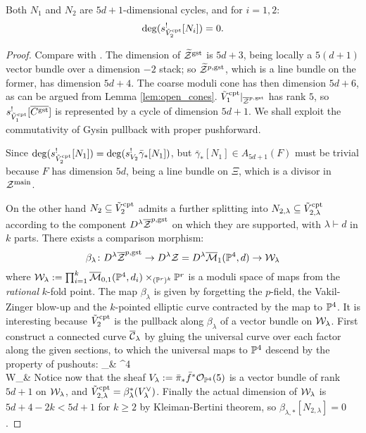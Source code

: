 \begin{lem}\label{lem:boundary}
 Both $N_1$ and $N_2$ are $5d+1$-dimensional cycles, and for $i=1,2$: \[\deg(s_{\tilde{V}_2^{\rm{cpt}}}^![N_i])=0.\]
\end{lem}
\begin{proof}
 Compare with \cite[Lemma 8.1]{CL-pfields}. The dimension of $\widetilde{\mathcal Z}^{\rm{gst}}$ is $5d+3$, being locally a $5(d+1)$ vector bundle over a dimension $-2$ stack; so $\widetilde{\mathcal Z}^{p,\rm{gst}}$, which is a line bundle on the former, has dimension $5d+4$. The coarse moduli cone has then dimension $5d+6$, as can be argued from Lemma \ref{lem:open_cones}. $\tilde{V}_1^{\rm{cpt}}\rvert_{\overline{\mathcal Z}^{p,\rm{gst}}}$ has rank $5$, so $s_{\tilde{V}_1^{\rm{cpt}}}^![\overline {C^{\rm{gst}}}]$ is represented by a cycle of dimension $5d+1$. We shall exploit the commutativity of Gysin pullback with proper pushforward.

Since $\deg(s_{\tilde{V}_2^{\rm{cpt}}}^![N_1])=\deg(s_{V_2}^!\bar{\gamma}_*[N_1])$, but $\bar{\gamma}_*[N_1]\in A_{5d+1}(F)$ must be trivial because $F$ has dimension $5d$, being a line bundle on $\Xi$, which is a divisor in $\mathcal Z^{\rm{main}}$.

On the other hand $N_2\subseteq \tilde{V}_2^{\rm{cpt}}$ admits a further splitting into $N_{2,\lambda}\subseteq \tilde{V}_{2,\lambda}^{\rm{cpt}}$ according to the component $D^{\lambda}\overline{\mathcal Z}^{p,\rm{gst}}$ on which they are supported, with $\lambda\vdash d$ in $k$ parts. There exists a comparison morphism:
\[\beta_{\lambda}\colon D^\lambda\overline{\mathcal Z}^{p,\rm{gst}}\rightarrow D^\lambda\mathcal Z=D^\lambda\overline{\mathcal{M}}_1(\mathbb P^4,d)\rightarrow \mathcal W_{\lambda}\]
where $\mathcal W_{\lambda}:=\prod_{i=1}^k \overline{\mathcal{M}}_{0,1}(\mathbb P^4,d_i)\times_{(\mathbb P^r)^k}\mathbb P^r$ is a moduli space of maps from the \emph{rational} $k$-fold point. The map $\beta_{\lambda}$ is given by forgetting the $p$-field,  the Vakil-Zinger blow-up and the $k$-pointed elliptic curve contracted by the map to $\mathbb P^4$. It is interesting because $\tilde{V}_2^{\rm{cpt}}$ is the pullback along $\beta_{\lambda}$ of a vector bundle on $\mathcal W_{\lambda}$. First construct a connected curve $\overline {\mathcal{C}}_\lambda$ by gluing the universal curve over each factor along the given sections, to which the universal maps to $\mathbb P^4$ descend by the property of pushouts:
\bcd
\overline \cC_\lambda \ar[d,"\bar\pi"]\ar[r,"\bar f"] & \PP^4 \\
\pazocal W_\lambda &
\ecd
Notice now that the sheaf $V_\lambda:=\bar\pi_*\bar f^*\mathcal{O}_{\mathbb P^4}(5)$ is a vector bundle of rank $5d+1$ on $\mathcal W_\lambda$, and $\tilde{V}_{2,\lambda}^{\rm{cpt}}=\beta_{\lambda}^*(V_\lambda^\vee)$. Finally the actual dimension of $\mathcal W_\lambda$ is $5d+4-2k <5d+1$ for $k\geq 2$ by Kleiman-Bertini theorem, so $\beta_{\lambda,*}[N_{2,\lambda}]=0$.

\end{proof}
